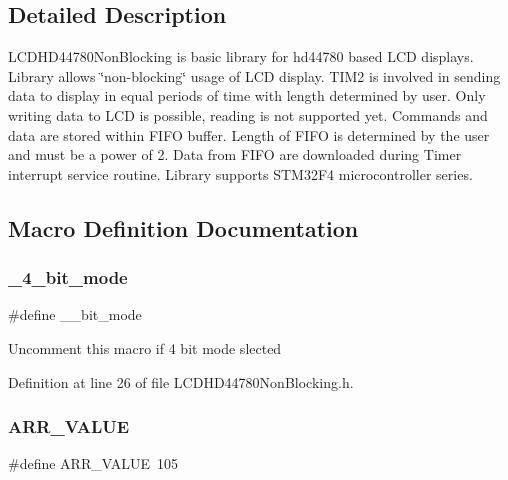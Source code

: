 \subsection{Detailed Description}
L\+C\+D\+H\+D44780\+Non\+Blocking is basic library for hd44780 based L\+CD displays. Library allows \char`\"{}non-\/blocking\char`\"{} usage of L\+CD display. T\+I\+M2 is involved in sending data to display in equal periods of time with length determined by user. Only writing data to L\+CD is possible, reading is not supported yet. Commands and data are stored within F\+I\+FO buffer. Length of F\+I\+FO is determined by the user and must be a power of 2. Data from F\+I\+FO are downloaded during Timer interrupt service routine. Library supports S\+T\+M32\+F4 microcontroller series. 



\subsection{Macro Definition Documentation}
\mbox{\label{group___l_c_d_h_d44780_non_blocking_ga144c413a73ea550cef14bb17c31df074_ga144c413a73ea550cef14bb17c31df074}} 
\subsubsection{\texorpdfstring{\_4\_bit\_mode}{\_4\_bit\_mode}}
{\footnotesize\ttfamily \#define \+\_\+\_\+bit\+\_\+mode}

Uncomment this macro if 4 bit mode slected 

Definition at line 26 of file L\+C\+D\+H\+D44780\+Non\+Blocking.\+h.

\mbox{\label{group___l_c_d_h_d44780_non_blocking_ga7a8e8722b361c452c1468e2c195f2685_ga7a8e8722b361c452c1468e2c195f2685}} 
\subsubsection{\texorpdfstring{ARR\_VALUE}{ARR\_VALUE}}
{\footnotesize\ttfamily \#define A\+R\+R\+\_\+\+V\+A\+L\+UE~105}

